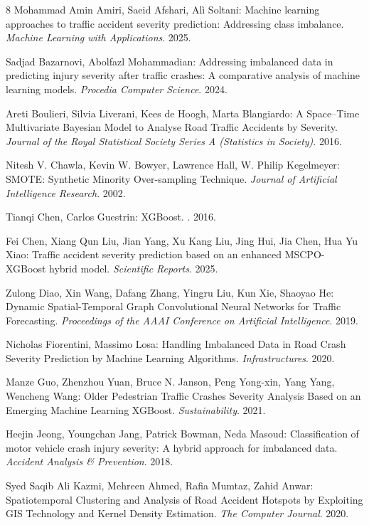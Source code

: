 \documentclass[runningheads]{llncs}
\begin{document}
\begin{thebibliography}{8}
Mohammad Amin Amiri, Saeid Afshari, Alì Soltani: Machine learning approaches to traffic accident severity prediction: Addressing class imbalance. \textit{Machine Learning with Applications}. 2025. 

Sadjad Bazarnovi, Abolfazl Mohammadian: Addressing imbalanced data in predicting injury severity after traffic crashes: A comparative analysis of machine learning models. \textit{Procedia Computer Science}. 2024. 

Areti Boulieri, Silvia Liverani, Kees de Hoogh, Marta Blangiardo: A Space–Time Multivariate Bayesian Model to Analyse Road Traffic Accidents by Severity. \textit{Journal of the Royal Statistical Society Series A (Statistics in Society)}. 2016. 

Nitesh V. Chawla, Kevin W. Bowyer, Lawrence Hall, W. Philip Kegelmeyer: SMOTE: Synthetic Minority Over-sampling Technique. \textit{Journal of Artificial Intelligence Research}. 2002. 

Tianqi Chen, Carlos Guestrin: XGBoost. \textit{}. 2016. 

Fei Chen, Xiang Qun Liu, Jian Yang, Xu Kang Liu, Jing Hui, Jia Chen, Hua Yu Xiao: Traffic accident severity prediction based on an enhanced MSCPO-XGBoost hybrid model. \textit{Scientific Reports}. 2025. 

Zulong Diao, Xin Wang, Dafang Zhang, Yingru Liu, Kun Xie, Shaoyao He: Dynamic Spatial-Temporal Graph Convolutional Neural Networks for Traffic Forecasting. \textit{Proceedings of the AAAI Conference on Artificial Intelligence}. 2019. 

Nicholas Fiorentini, Massimo Losa: Handling Imbalanced Data in Road Crash Severity Prediction by Machine Learning Algorithms. \textit{Infrastructures}. 2020. 

Manze Guo, Zhenzhou Yuan, Bruce N. Janson, Peng Yong-xin, Yang Yang, Wencheng Wang: Older Pedestrian Traffic Crashes Severity Analysis Based on an Emerging Machine Learning XGBoost. \textit{Sustainability}. 2021. 

Heejin Jeong, Youngchan Jang, Patrick Bowman, Neda Masoud: Classification of motor vehicle crash injury severity: A hybrid approach for imbalanced data. \textit{Accident Analysis \& Prevention}. 2018. 

Syed Saqib Ali Kazmi, Mehreen Ahmed, Rafia Mumtaz, Zahid Anwar: Spatiotemporal Clustering and Analysis of Road Accident Hotspots by Exploiting GIS Technology and Kernel Density Estimation. \textit{The Computer Journal}. 2020. 


\end{thebibliography}
\end{document}
